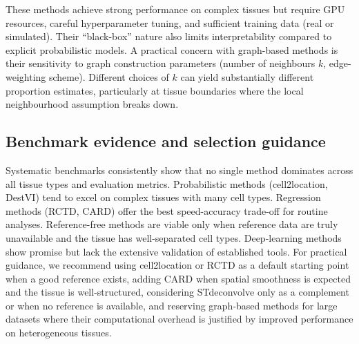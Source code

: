 These methods achieve strong performance on complex tissues but require GPU resources, careful hyperparameter tuning, and sufficient training data (real or simulated). Their ``black-box'' nature also limits interpretability compared to explicit probabilistic models. A practical concern with graph-based methods is their sensitivity to graph construction parameters (number of neighbours $k$, edge-weighting scheme). Different choices of $k$ can yield substantially different proportion estimates, particularly at tissue boundaries where the local neighbourhood assumption breaks down.

\subsection{Benchmark evidence and selection guidance}

Systematic benchmarks \citep{li2023benchmarking,yan2024benchmarking} consistently show that no single method dominates across all tissue types and evaluation metrics. Probabilistic methods (cell2location, DestVI) tend to excel on complex tissues with many cell types. Regression methods (RCTD, CARD) offer the best speed-accuracy trade-off for routine analyses. Reference-free methods are viable only when reference data are truly unavailable and the tissue has well-separated cell types. Deep-learning methods show promise but lack the extensive validation of established tools. For practical guidance, we recommend using cell2location or RCTD as a default starting point when a good reference exists, adding CARD when spatial smoothness is expected and the tissue is well-structured, considering STdeconvolve only as a complement or when no reference is available, and reserving graph-based methods for large datasets where their computational overhead is justified by improved performance on heterogeneous tissues.
